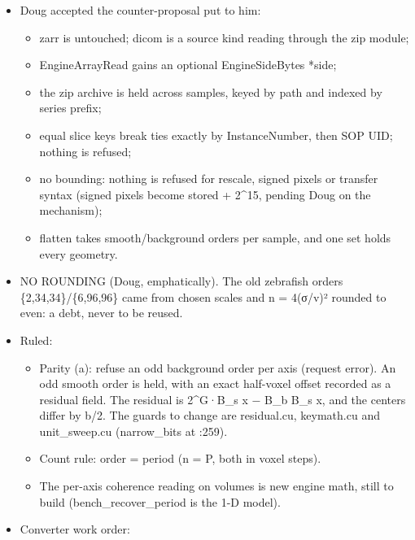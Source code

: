 \begin{itemize}
\begin{itemize}
\item sections in order of how often they're read (the file is read FIFO): head and geometry, then pixel offsets and stream, then deflated DICOM header bytes (which engine\_\allowbreak{}iapx\_\allowbreak{}load hands back), then the member list;
\item CRC-64 per part, with no zip CRC-32 rejoin.
\end{itemize}
\item Doug accepted the counter-proposal put to him:

\begin{itemize}
\item zarr is untouched; dicom is a source kind reading through the zip module;
\item EngineArrayRead gains an optional EngineSideBytes *side;
\item the zip archive is held across samples, keyed by path and indexed by series prefix;
\item equal slice keys break ties exactly by InstanceNumber, then SOP UID; nothing is refused;
\item no bounding: nothing is refused for rescale, signed pixels or transfer syntax (signed pixels become stored + 2\textasciicircum{}15, pending Doug on the mechanism);
\item flatten takes smooth/background orders per sample, and one set holds every geometry.
\end{itemize}
\item NO ROUNDING (Doug, emphatically). The old zebrafish orders \{2,34,34\}/\{6,96,96\} came from chosen scales and n = 4(σ/v)² rounded to even: a debt, never to be reused.
\item Ruled:

\begin{itemize}
\item Parity (a): refuse an odd background order per axis (request error). An odd smooth order is held, with an exact half-voxel offset recorded as a residual field. The residual is 2\textasciicircum{}G·B\_\allowbreak{}s x − B\_\allowbreak{}b B\_\allowbreak{}s x, and the centers differ by b/2. The guards to change are residual.cu, keymath.cu and unit\_\allowbreak{}sweep.cu (narrow\_\allowbreak{}bits at :259).
\item Count rule: order = period (n = P, both in voxel steps).
\item The per-axis coherence reading on volumes is new engine math, still to build (bench\_\allowbreak{}recover\_\allowbreak{}period is the 1-D model).
\end{itemize}
\item Converter work order:


\end{itemize}
